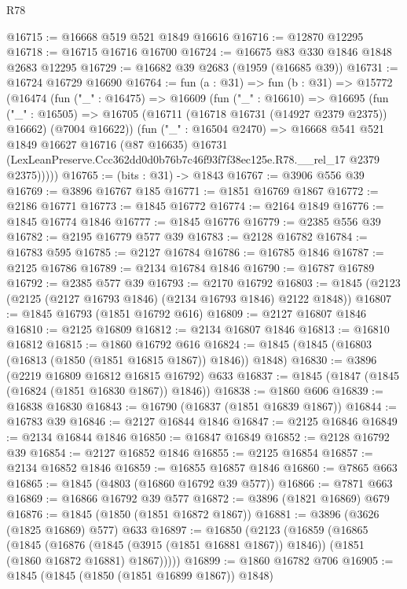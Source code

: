 \begin{lexlean}{R78}
\begin{coremodule}
@16715 := @16668 @519 @521 @1849 @16616
@16716 := @12870 @12295
@16718 := @16715 @16716 @16700
@16724 := @16675 @83 @330 @1846 @1848 @2683 @12295
@16729 := @16682 @39 @2683 (@1959 (@16685 @39))
@16731 := @16724 @16729 @16690
@16764 := fun (a : @31) =>
  fun (b : @31) =>
  @15772
    (@16474
      (fun ("_" : @16475) =>
      @16609
        (fun ("_" : @16610) =>
        @16695
          (fun ("_" : @16505) =>
          @16705 (@16711 (@16718 @16731 (@14927 @2379 @2375)) @16662) (@7004 @16622))
          (fun ("_" : @16504 @2470) =>
          @16668
            @541
            @521
            @1849
            @16627
            @16716
            (@87 @16635)
            @16731
            (LexLeanPreserve.Ccc362dd0d0b76b7c46f93f7f38ec125e.R78.__rel_17 @2379 @2375)))))
@16765 := (bits : @31) -> @1843
@16767 := @3906 @556 @39
@16769 := @3896 @16767 @185
@16771 := @1851 @16769 @1867
@16772 := @2186 @16771
@16773 := @1845 @16772
@16774 := @2164 @1849
@16776 := @1845 @16774 @1846
@16777 := @1845 @16776
@16779 := @2385 @556 @39
@16782 := @2195 @16779 @577 @39
@16783 := @2128 @16782
@16784 := @16783 @595
@16785 := @2127 @16784
@16786 := @16785 @1846
@16787 := @2125 @16786
@16789 := @2134 @16784 @1846
@16790 := @16787 @16789
@16792 := @2385 @577 @39
@16793 := @2170 @16792
@16803 := @1845 (@2123 (@2125 (@2127 @16793 @1846) (@2134 @16793 @1846) @2122 @1848))
@16807 := @1845 @16793 (@1851 @16792 @616)
@16809 := @2127 @16807 @1846
@16810 := @2125 @16809
@16812 := @2134 @16807 @1846
@16813 := @16810 @16812
@16815 := @1860 @16792 @616
@16824 := @1845 (@1845 (@16803 (@16813 (@1850 (@1851 @16815 @1867)) @1846)) @1848)
@16830 := @3896 (@2219 @16809 @16812 @16815 @16792) @633
@16837 := @1845 (@1847 (@1845 (@16824 (@1851 @16830 @1867)) @1846))
@16838 := @1860 @606
@16839 := @16838 @16830
@16843 := @16790 (@16837 (@1851 @16839 @1867))
@16844 := @16783 @39
@16846 := @2127 @16844 @1846
@16847 := @2125 @16846
@16849 := @2134 @16844 @1846
@16850 := @16847 @16849
@16852 := @2128 @16792 @39
@16854 := @2127 @16852 @1846
@16855 := @2125 @16854
@16857 := @2134 @16852 @1846
@16859 := @16855 @16857 @1846
@16860 := @7865 @663
@16865 := @1845 (@4803 (@16860 @16792 @39 @577))
@16866 := @7871 @663
@16869 := @16866 @16792 @39 @577
@16872 := @3896 (@1821 @16869) @679
@16876 := @1845 (@1850 (@1851 @16872 @1867))
@16881 := @3896 (@3626 (@1825 @16869) @577) @633
@16897 := @16850
    (@2123
      (@16859
        (@16865
          (@1845
            (@16876 (@1845 (@3915 (@1851 @16881 @1867)) @1846))
            (@1851 (@1860 @16872 @16881) @1867)))))
@16899 := @1860 @16782 @706
@16905 := @1845 (@1845 (@1850 (@1851 @16899 @1867)) @1848)

\end{coremodule}
\end{lexlean}
